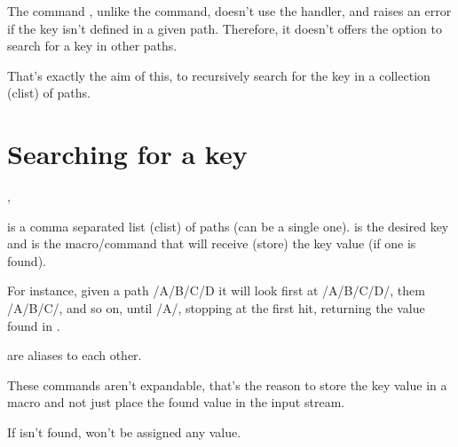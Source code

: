 \documentclass[10pt]{article}
\begin{document}
  
\begin{typesetabstract}

The command \tsobj{\pgfkeysvalueof}, unlike the \tsobj{\pgfkeys} command, doesn't use the  handler, and raises an error if the key isn't defined in a given path. Therefore, it doesn't offers the option to search for a key in other paths.

That's exactly the aim of this, to recursively search for the key in a collection (clist) of paths.
\end{typesetabstract}

\tableofcontents

\section{Searching for a key}
\begin{codedescribe}[code,update=2024/01/11]{\pgfkeysearchvalueof,\pgfkeysearch}
\begin{codesyntax}%
\end{codesyntax}
 is a comma separated list (clist) of paths (can be a single one).  is the desired key and  is the macro/command that will receive (store) the key value (if one is found).

For instance, given a path /A/B/C/D it will look first at /A/B/C/D/, them /A/B/C/, and so on, until /A/,
stopping at the first hit, returning the value found in .
  
\end{codedescribe}
\begin{tsremark}
  \tsobj{\pgfkeysearch,\pgfkeysearchvalueof} are aliases to each other.
\end{tsremark}
\begin{tsremark}
  These commands aren't expandable, that's the reason to store the key value in a macro and not just place the found value in the input stream.
\end{tsremark}
\begin{tsremark}
  If  isn't found,  won't be assigned any value.
\end{tsremark}
\end{document}
